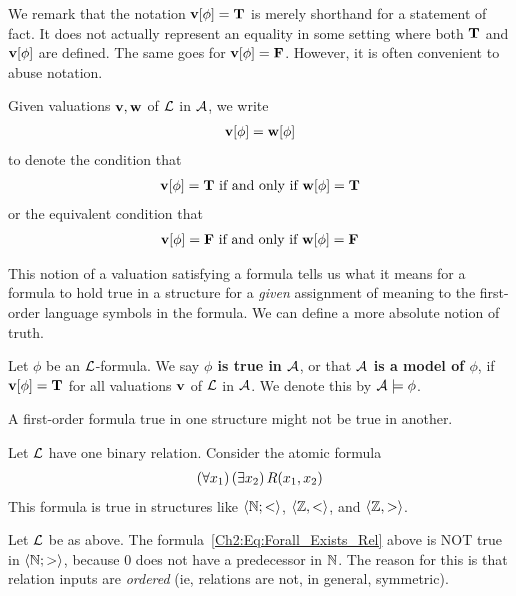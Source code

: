 We remark that the notation $\mathbf{v}\!\left[ \phi \right] = \mathbf{T}$ is merely shorthand for a statement of fact. It does not actually represent an equality in some setting where both $\mathbf{T}$ and $\mathbf{v}\!\left[ \phi \right]$ are defined. The same goes for $\mathbf{v}\!\left[ \phi \right] = \mathbf{F}$. However, it is often convenient to abuse notation.

\begin{boxconvention}
    Given valuations $\mathbf{v}, \mathbf{w}$ of $\mathcal{L}$ in $\mathcal{A}$, we write
    \begin{align*}
        \mathbf{v}\!\left[ \phi \right] = \mathbf{w}\!\left[ \phi \right]
    \end{align*}
    to denote the condition that
    \begin{align*}
        \mathbf{v}\!\left[ \phi \right] = \mathbf{T} \text{ if and only if } \mathbf{w}\!\left[ \phi \right] = \mathbf{T}
    \end{align*}
    or the equivalent condition that
    \begin{align*}
        \mathbf{v}\!\left[ \phi \right] = \mathbf{F} \text{ if and only if } \mathbf{w}\!\left[ \phi \right] = \mathbf{F}
    \end{align*}
\end{boxconvention}

This notion of a valuation satisfying a formula tells us what it means for a formula to hold true in a structure for a \textit{given} assignment of meaning to the first-order language symbols in the formula. We can define a more absolute notion of truth.

\begin{boxdefinition}
    Let $\phi$ be an $\mathcal{L}$-formula. We say \textbf{$\phi$ is true in $\mathcal{A}$}, or that \textbf{$\mathcal{A}$ is a model of $\phi$}, if $\mathbf{v}\!\left[ \phi \right] = \mathbf{T}$ for all valuations $\mathbf{v}$ of $\mathcal{L}$ in $\mathcal{A}$. We denote this by $\mathcal{A} \models \phi$.
\end{boxdefinition}

A first-order formula true in one structure might not be true in another.

\begin{boxexample}
    Let $\mathcal{L}$ have one binary relation. Consider the atomic formula
    \begin{align}
        \left( \forall x_1 \right)\left( \exists x_2 \right) R\!\left( x_1, x_2 \right)
        \label{Ch2:Eq:Forall_Exists_Rel}
    \end{align}
    This formula is true in structures like $\left\langle \mathbb{N}; < \right\rangle$, $\left\langle \mathbb{Z}, < \right\rangle$, and $\left\langle \mathbb{Z}, > \right\rangle$.
\end{boxexample}
\begin{boxnexample}
    Let $\mathcal{L}$ be as above. The formula~\eqref{Ch2:Eq:Forall_Exists_Rel} above is NOT true in $\left\langle \mathbb{N}; > \right\rangle$, because $0$ does not have a predecessor in $\mathbb{N}$. The reason for this is that relation inputs are \textit{ordered} (ie, relations are not, in general, symmetric).
\end{boxnexample}

